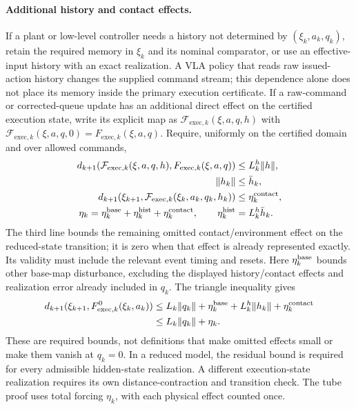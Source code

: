 \paragraph{Additional history and contact effects.}
If a plant or low-level controller needs a history not determined by
$(\xi_k,a_k,q_k)$, retain the required memory in $\xi_k$ and its
nominal comparator, or use an effective-input history with an exact
realization. A VLA policy that reads raw issued-action history changes the
supplied command stream; this dependence alone does not place its memory
inside the primary execution certificate. If a raw-command or corrected-queue
update has an additional direct effect on the certified execution state,
write its explicit map as $\mathcal F_{\mathrm{exec},k}(\xi,a,q,h)$ with
$\mathcal F_{\mathrm{exec},k}(\xi,a,q,0)=F_{\mathrm{exec},k}(\xi,a,q)$.
Require, uniformly on the certified domain and over allowed commands,
\begin{equation}
\begin{aligned}
d_{k+1}(\mathcal F_{\mathrm{exec},k}(\xi,a,q,h),F_{\mathrm{exec},k}(\xi,a,q))
&\le L_k^h\|h\|,\\
\|h_k\|&\le\bar h_k,\\
d_{k+1}(\xi_{k+1},\mathcal F_{\mathrm{exec},k}(\xi_k,a_k,q_k,h_k))
&\le\eta_k^{\rm contact},\\
\eta_k=\eta_k^{\rm base}+\eta_k^{\rm hist}+\eta_k^{\rm contact},\qquad
\eta_k^{\rm hist}&=L_k^h\bar h_k.
\end{aligned}
\label{eq:app-history-forcing}
\end{equation}
The third line bounds the remaining omitted contact/environment effect on
the reduced-state transition; it is zero when that effect is already
represented exactly. Its validity must include the relevant event timing
and resets. Here $\eta_k^{\rm base}$ bounds other base-map disturbance,
excluding the displayed history/contact effects and realization error
already included in $q_k$. The triangle inequality gives
\[
\begin{aligned}
d_{k+1}(\xi_{k+1},F_{\mathrm{exec},k}^0(\xi_k,a_k))
&\le L_k\|q_k\|+\eta_k^{\rm base}+L_k^h\|h_k\|+
\eta_k^{\rm contact}\\
&\le L_k\|q_k\|+\eta_k.
\end{aligned}
\]
These are required bounds, not definitions that make omitted effects small
or make them vanish at $q_k=0$. In a reduced model, the residual bound is
required for every admissible hidden-state realization. A different
execution-state realization requires its own distance-contraction and
transition check. The tube proof
uses total forcing $\eta_k$, with each physical effect counted once.

